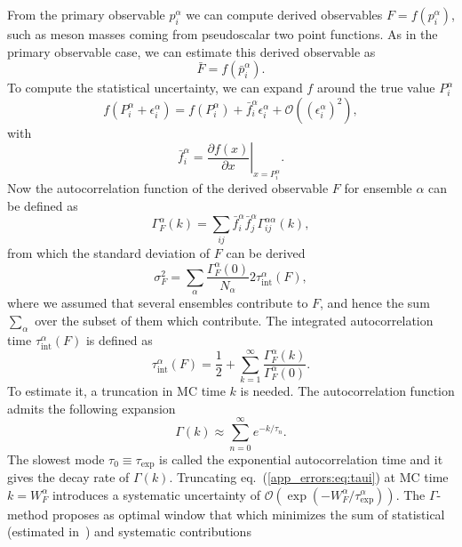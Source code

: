 From the primary observable $p_i^{\alpha}$ we can compute derived observables $F=f(p_i^{\alpha})$, such as meson masses coming from pseudoscalar two point functions. As in the primary observable case, we can estimate this derived observable as
\begin{equation}
\bar{F}=f(\bar{p}_i^{\alpha}).
\end{equation}
To compute the statistical uncertainty, we can expand $f$ around the true value $P_i^{\alpha}$
\begin{equation}
f(P_{i}^{\alpha}+\epsilon_{i}^{\alpha})=f(P_{i}^{\alpha})+\bar{f}_i^{\alpha}\epsilon_{i}^{\alpha}+\mathcal{O}((\epsilon_{i}^{\alpha})^2),
\end{equation}
with
\begin{equation}
\bar{f}_i^{\alpha}=\left.\frac{\partial f(x)}{\partial x}\right|_{x=P_{i}^{\alpha}}.
\end{equation}
Now the autocorrelation function of the derived observable $F$ for ensemble $\alpha$ can be defined as
\begin{equation}
\Gamma_F^{\alpha}(k)=\sum_{ij}\bar{f}_i^{\alpha}\bar{f}_j^{\alpha}\Gamma_{ij}^{\alpha\alpha}(k),
\end{equation}
from which the standard deviation of $F$ can be derived
\begin{equation}
\sigma_F^2=\sum_{\alpha}\frac{\Gamma_F^{\alpha}(0)}{N_{\alpha}}2\tau_{\textrm{int}}^{\alpha}(F),
\end{equation}
where we assumed that several ensembles contribute to $F$, and hence the sum $\sum_{\alpha}$ over the subset of them which contribute. The integrated autocorrelation time $\tau_{\textrm{int}}^{\alpha}(F)$ is defined as
\begin{equation}
\label{app_errors:eq:taui}
\tau_{\textrm{int}}^{\alpha}(F)=\frac{1}{2}+\sum_{k=1}^{\infty}\frac{\Gamma_F^{\alpha}(k)}{\Gamma_F^{\alpha}(0)}.
\end{equation}
To estimate it, a truncation in MC time $k$ is needed. The autocorrelation function admits the following expansion~\citep{Luscher:2011kk,Schaefer:2010hu}
\begin{equation}
\Gamma(k)\approx\sum_{n=0}^{\infty}e^{-k/\tau_n}.
\end{equation}
The slowest mode $\tau_0\equiv\tau_{\textrm{exp}}$ is called the exponential autocorrelation time and it gives the decay rate of $\Gamma(k)$. Truncating eq.~(\ref{app_errors:eq:taui}) at MC time $k=W_F^{\alpha}$ introduces a systematic uncertainty of $\mathcal{O}(\exp(-W_F^{\alpha}/\tau_{\textrm{exp}}^{\alpha}))$. The $\Gamma$-method proposes as optimal window that which minimizes the sum of statistical (estimated in~\citep{Madras:1988ei}) and systematic contributions
